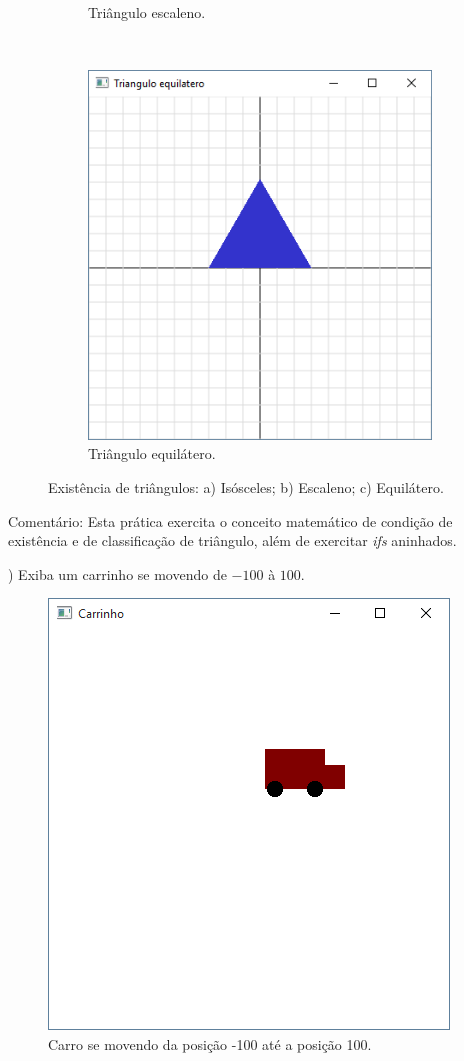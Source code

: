 \begin{renumerate}
\begin{figure}[H]
\begin{subfigure}[t]{0.3\textwidth}
        \caption{Triângulo escaleno.}
        \label{fig:cap01_ex23b}
    \end{subfigure}
    ~
    \begin{subfigure}[t]{0.3\textwidth}
        \centerline{\includegraphics[width=.9\textwidth]{img/cap1_ex23c}}
        \caption{Triângulo equilátero.}
        \label{fig:cap01_ex23c}
    \end{subfigure}
    \caption{Existência de triângulos: a) Isósceles; b) Escaleno; c) Equilátero.}
\end{figure}

\label{ex:cap01_ex23}

Comentário: Esta prática exercita o conceito matemático de condição de existência e de classificação de triângulo, além de exercitar \emph{ifs} aninhados.

%


\item)
Exiba um carrinho se movendo de $-100$ à $100$.
  \label{ex:cap01_ex6}

  \begin{figure}[H]
    \centerline{\includegraphics[width=.3\textwidth]{img/cap1_ex5.png}}
    \caption{Carro se movendo da posição -100 até a posição 100.}
    \label{fig:cap01_ex6}
  \end{figure}


\end{renumerate}
